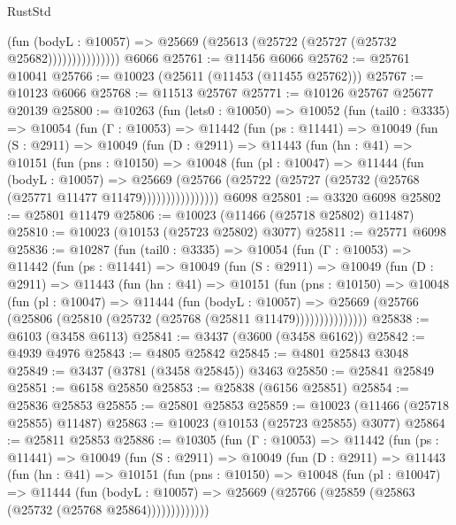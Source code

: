 \begin{lexlean}{RustStd}
\begin{coremodule}
                        (fun (bodyL : @10057) =>
                        @25669 (@25613 (@25722 (@25727 (@25732 @25682)))))))))))))))
    @6066
@25761 := @11456 @6066
@25762 := @25761 @10041
@25766 := @10023 (@25611 (@11453 (@11455 @25762)))
@25767 := @10123 @6066
@25768 := @11513 @25767
@25771 := @10126 @25767 @25677 @20139
@25800 := @10263
    (fun (lets0 : @10050) =>
    @10052
      (fun (tail0 : @3335) =>
      @10054
        (fun (Γ : @10053) =>
        @11442
          (fun (ps : @11441) =>
          @10049
            (fun (S : @2911) =>
            @10049
              (fun (D : @2911) =>
              @11443
                (fun (hn : @41) =>
                @10151
                  (fun (pns : @10150) =>
                  @10048
                    (fun (pl : @10047) =>
                    @11444
                      (fun (bodyL : @10057) =>
                      @25669
                        (@25766
                          (@25722 (@25727 (@25732 (@25768 (@25771 @11477 @11479))))))))))))))))
    @6098
@25801 := @3320 @6098
@25802 := @25801 @11479
@25806 := @10023 (@11466 (@25718 @25802) @11487)
@25810 := @10023 (@10153 (@25723 @25802) @3077)
@25811 := @25771 @6098
@25836 := @10287
    (fun (tail0 : @3335) =>
    @10054
      (fun (Γ : @10053) =>
      @11442
        (fun (ps : @11441) =>
        @10049
          (fun (S : @2911) =>
          @10049
            (fun (D : @2911) =>
            @11443
              (fun (hn : @41) =>
              @10151
                (fun (pns : @10150) =>
                @10048
                  (fun (pl : @10047) =>
                  @11444
                    (fun (bodyL : @10057) =>
                    @25669 (@25766 (@25806 (@25810 (@25732 (@25768 (@25811 @11479)))))))))))))))
@25838 := @6103 (@3458 @6113)
@25841 := @3437 (@3600 (@3458 @6162))
@25842 := @4939 @4976
@25843 := @4805 @25842
@25845 := @4801 @25843 @3048
@25849 := @3437 (@3781 (@3458 @25845)) @3463
@25850 := @25841 @25849
@25851 := @6158 @25850
@25853 := @25838 (@6156 @25851)
@25854 := @25836 @25853
@25855 := @25801 @25853
@25859 := @10023 (@11466 (@25718 @25855) @11487)
@25863 := @10023 (@10153 (@25723 @25855) @3077)
@25864 := @25811 @25853
@25886 := @10305
    (fun (Γ : @10053) =>
    @11442
      (fun (ps : @11441) =>
      @10049
        (fun (S : @2911) =>
        @10049
          (fun (D : @2911) =>
          @11443
            (fun (hn : @41) =>
            @10151
              (fun (pns : @10150) =>
              @10048
                (fun (pl : @10047) =>
                @11444
                  (fun (bodyL : @10057) =>
                  @25669 (@25766 (@25859 (@25863 (@25732 (@25768 @25864)))))))))))))

\end{coremodule}
\end{lexlean}
